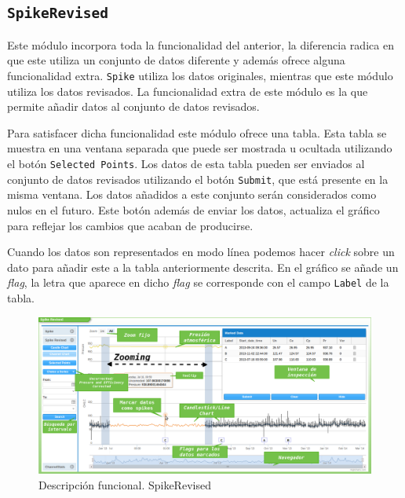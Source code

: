 	\subsection{\texttt{SpikeRevised}}
		Este módulo incorpora toda la funcionalidad del anterior, la diferencia radica en que este utiliza un conjunto de
		datos diferente y además ofrece alguna funcionalidad extra. \texttt{Spike} utiliza los datos originales, mientras que este módulo
		utiliza los datos revisados. La funcionalidad extra de este módulo es la que permite añadir datos al conjunto de datos revisados.
		\par
		Para satisfacer dicha funcionalidad este módulo ofrece una tabla. Esta tabla se muestra en una ventana separada que puede ser mostrada
		u ocultada utilizando el botón \texttt{Selected Points}. Los datos de esta tabla pueden ser enviados al conjunto de datos revisados
		utilizando el botón \texttt{Submit}, que está presente en la misma ventana. Los datos añadidos a este conjunto serán considerados como
		nulos en el futuro. Este botón además de enviar los datos, actualiza el gráfico para reflejar los cambios que acaban de producirse.
		\par
		Cuando los datos son representados en modo línea podemos hacer \emph{click} sobre un dato para añadir este a la tabla anteriormente
		descrita. En el gráfico se añade un \emph{flag}, la letra que aparece en dicho \emph{flag} se corresponde con el campo
		\texttt{Label} de la tabla.
		\begin{figure}[h]
			\centering
			\includegraphics[keepaspectratio, width=1\textwidth]{./img/spikeRevised.png}
			\caption{Descripción funcional. SpikeRevised}   
			\label{fig:spikeRevised}
		\end{figure}
